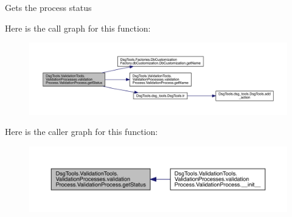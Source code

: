 \begin{DoxyVerb}Gets the process status
\end{DoxyVerb}
 Here is the call graph for this function\+:
\nopagebreak
\begin{figure}[H]
\begin{center}
\leavevmode
\includegraphics[width=350pt]{class_dsg_tools_1_1_validation_tools_1_1_validation_processes_1_1validation_process_1_1_validation_process_a6668cd6df331f36ef02772e98045242b_cgraph}
\end{center}
\end{figure}
Here is the caller graph for this function\+:
\nopagebreak
\begin{figure}[H]
\begin{center}
\leavevmode
\includegraphics[width=350pt]{class_dsg_tools_1_1_validation_tools_1_1_validation_processes_1_1validation_process_1_1_validation_process_a6668cd6df331f36ef02772e98045242b_icgraph}
\end{center}
\end{figure}
\mbox{\label{class_dsg_tools_1_1_validation_tools_1_1_validation_processes_1_1validation_process_1_1_validation_process_a00ab1786a814a65c53db1fac5d3f6218}} 
